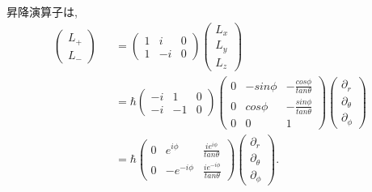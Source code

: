 \documentclass[11pt,a4paper]{jsarticle}
\begin{document}
昇降演算子は, 
\begin{eqnarray}
\left( \begin{array}{c} L_+ \\ L_- \end{array} \right) &&= \left( \begin{array}{ccc} 1 & i& 0 \\ 1 &-i &0\end{array} \right) \left( \begin{array}{c} L_x \\ L_y \\ L_z \end{array} \right)\nonumber \\
 &&= \hbar \left( \begin{array}{ccc} -i & 1 & 0 \\ -i &-1 &0\end{array} \right) \left(\begin{array}{ccc} 0 & -sin\phi &- \frac{cos\phi}{tan\theta } \\ 0 & cos\phi & - \frac{sin\phi}{tan\theta }\\ 0 & 0& 1 \end{array} \right) \left( \begin{array}{c} \partial_r \\ \partial_\theta \\ \partial_\phi \end{array} \right)\nonumber \\
&&= \hbar \left( \begin{array}{ccc} 0 & e^{i\phi}&   \frac{ie^{i\phi}}{tan\theta } \\ 0 & -e^{-i\phi}&  \frac{ie^{-i\phi}}{tan\theta } \end{array} \right) \left( \begin{array}{c} \partial_r \\ \partial_\theta \\ \partial_\phi \end{array} \right). \nonumber \\
\end{eqnarray}
\end{document}
